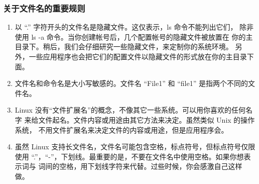 \fboxrule=6pt \fboxsep=4pt
\begin{colorboxed}[boxcolor=lightgray,bgcolor=white]
\subsubsection{关于文件名的重要规则}
\begin{enumerate}
	\item 以 ``.'' 字符开头的文件名是隐藏文件。这仅表示，ls 命令不能列出它们， 除非使用 ls -a 命令。当你创建帐号后，几个配置帐号的隐藏文件被放置在 你的主目录下。稍后，我们会仔细研究一些隐藏文件，来定制你的系统环境。 另外，一些应用程序也会把它们的配置文件以隐藏文件的形式放在你的主目录下面。
	\item 文件名和命令名是大小写敏感的。文件名 “File1” 和 “file1” 是指两个不同的文件名。
	\item Linux 没有“文件扩展名”的概念，不像其它一些系统。可以用你喜欢的任何名字 来给文件起名。文件内容或用途由其它方法来决定。虽然类似 Unix 的操作系统， 不用文件扩展名来决定文件的内容或用途，但是应用程序会。
	\item 虽然 Linux 支持长文件名，文件名可能包含空格，标点符号，但标点符号仅限 使用 ``.''，``-''，下划线。最重要的是，不要在文件名中使用空格。如果你想表示词与 词间的空格，用下划线字符来代替。过些时候，你会感激自己这样做。
\end{enumerate}
\end{colorboxed}
